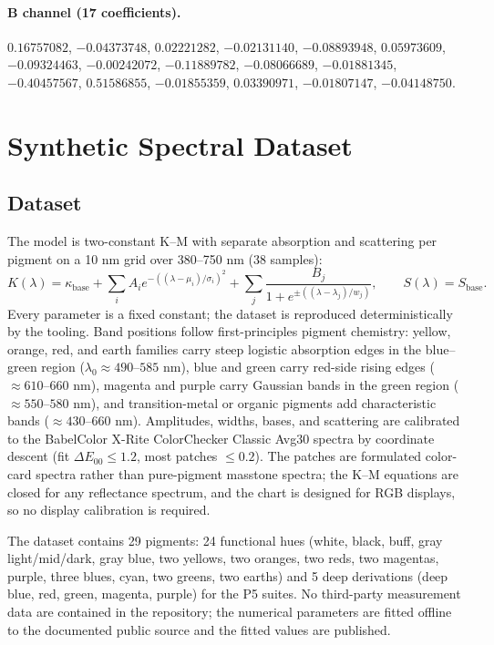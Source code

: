 \paragraph{B channel (17 coefficients).}
$0.16757082$, $-0.04373748$, $0.02221282$, $-0.02131140$, $-0.08893948$, $0.05973609$, $-0.09324463$, $-0.00242072$, $-0.11889782$, $-0.08066689$, $-0.01881345$, $-0.40457567$, $0.51586855$, $-0.01855359$, $0.03390971$, $-0.01807147$, $-0.04148750$.

\section{Synthetic Spectral Dataset}
\label{app:synthetic}

\subsection{Dataset}
The model is two-constant K--M with separate absorption and scattering per pigment on a 10 nm grid over 380--750 nm (38 samples):
\begin{equation}
K(\lambda)=\kappa_{\mathrm{base}}+\sum_{i}A_{i}e^{-((\lambda-\mu_{i})/\sigma_{i})^{2}}+\sum_{j}\frac{B_{j}}{1+e^{\pm((\lambda-\lambda_{j})/w_{j})}},
\qquad S(\lambda)=S_{\mathrm{base}}.
\end{equation}
Every parameter is a fixed constant; the dataset is reproduced deterministically by the tooling. Band positions follow first-principles pigment chemistry: yellow, orange, red, and earth families carry steep logistic absorption edges in the blue--green region ($\lambda_{0}\approx490$--$585$ nm), blue and green carry red-side rising edges ($\approx610$--$660$ nm), magenta and purple carry Gaussian bands in the green region ($\approx550$--$580$ nm), and transition-metal or organic pigments add characteristic bands ($\approx430$--$660$ nm). Amplitudes, widths, bases, and scattering are calibrated to the BabelColor X-Rite ColorChecker Classic Avg30 spectra \cite{pascale2012} by coordinate descent (fit $\Delta E_{00}\le1.2$, most patches $\le0.2$). The patches are formulated color-card spectra rather than pure-pigment masstone spectra; the K--M equations are closed for any reflectance spectrum, and the chart is designed for RGB displays, so no display calibration is required.

The dataset contains 29 pigments: 24 functional hues (white, black, buff, gray light/mid/dark, gray blue, two yellows, two oranges, two reds, two magentas, purple, three blues, cyan, two greens, two earths) and 5 deep derivations (deep blue, red, green, magenta, purple) for the P5 suites. No third-party measurement data are contained in the repository; the numerical parameters are fitted offline to the documented public source and the fitted values are published.

